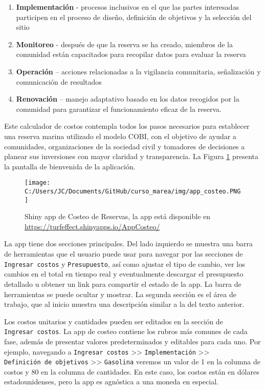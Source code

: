 \documentclass[]{krantz}
\providecommand{\tightlist}{%
  \setlength{\itemsep}{0pt}\setlength{\parskip}{0pt}}
\begin{document}
\begin{enumerate}
\def\labelenumi{\arabic{enumi}.}
\tightlist
\item
  \textbf{Implementación} - procesos inclusivos en el que las partes interesadas participen en el proceso de diseño, definición de objetivos y la selección del sitio
\item
  \textbf{Monitoreo} - después de que la reserva se ha creado, miembros de la comunidad están capacitados para recopilar datos para evaluar la reserva
\item
  \textbf{Operación} -- acciones relacionadas a la vigilancia comunitaria, señalización y comunicación de resultados
\item
  \textbf{Renovación} -- manejo adaptativo basado en los datos recogidos por la comunidad para garantizar el funcionamiento eficaz de la reserva.
\end{enumerate}

Este calculador de costos contempla todos los pasos necesarios para establecer una reserva marina utilizado el modelo COBI, con el objetivo de ayudar a comunidades, organizaciones de la sociedad civil y tomadores de decisiones a planear sus inversiones con mayor claridad y transparencia. La Figura \ref{fig:shiny-costeo} presenta la pantalla de bienvenida de la aplicación.

\begin{figure}
\centering
\texttt{[image: C:/Users/JC/Documents/GitHub/curso\_marea/img/app\_costeo.PNG]}
\caption{\label{fig:shiny-costeo}Shiny app de Costeo de Reservas, la app está disponible en \url{https://turfeffect.shinyapps.io/AppCosteo/}}
\end{figure}

La app tiene dos secciones principales. Del lado izquierdo se muestra una barra de herramientas que el usuario puede usar para navegar por las secciones de \texttt{Ingresar\ costos} y \texttt{Presupuesto}, así como ajustar el tipo de cambio, ver los cambios en el total en tiempo real y eventualmente descargar el presupuesto detallado u obtener un link para compartir el estado de la app. La barra de herramientas se puede ocultar y mostrar. La segunda sección es el área de trabajo, que al inicio muestra una descripción similar a la del texto anterior.

Los costos unitarios y cantidades pueden ser editados en la sección de \texttt{Ingresar\ costos}. La app de costeo contiene los rubros más comunes de cada fase, además de presentar valores predeterminados y editables para cada uno. Por ejemplo, navegando a \texttt{Ingresar\ costos} \textgreater{}\textgreater{} \texttt{Implementación} \textgreater{}\textgreater{} \texttt{Definición\ de\ objetivos} \textgreater{}\textgreater{} \texttt{Gasolina} veremos un valor de 1 en la columna de costos y 80 en la columna de cantidades. En este caso, los costos están en dólares estadounidenses, pero la app es agnóstica a una moneda en especial.
\end{document}
